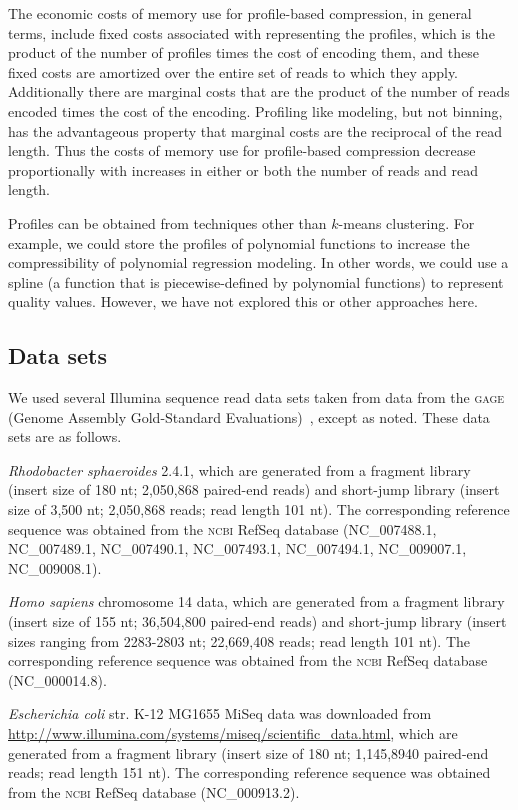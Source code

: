 \documentclass{bioinfo}
\begin{document}
\begin{methods}
The economic costs of memory use for profile-based compression, in
general terms, include fixed costs associated with representing the
profiles, which is the product of the number of profiles times the
cost of encoding them, and these fixed costs are amortized over the
entire set of reads to which they apply. Additionally there are
marginal costs that are the product of the number of reads encoded
times the cost of the encoding. Profiling like modeling, but not
binning, has the advantageous property that marginal costs are the
reciprocal of the read length. Thus the costs of memory use for
profile-based compression decrease proportionally with increases in
either or both the number of reads and read length.

Profiles can be obtained from techniques other than $k$-means
clustering. For example, we could store the profiles of polynomial
functions to increase the compressibility of polynomial regression
modeling. In other words, we could use a spline (a function that is
piecewise-defined by polynomial functions) to represent quality
values. However, we have not explored this or other approaches here.

\subsection{Data sets}

We used several Illumina sequence read data sets taken from data from
the \textsc{gage} (Genome Assembly Gold-Standard
Evaluations)~\citep{Salzberg:2012rc}, except as noted. These data sets
are as follows.

\textit{Rhodobacter sphaeroides} 2.4.1, which are generated from a
fragment library (insert size of 180 nt; 2,050,868 paired-end reads)
and short-jump library (insert size of 3,500 nt; 2,050,868 reads; read
length 101 nt). The corresponding reference sequence was obtained from
the \textsc{ncbi} RefSeq database (NC\_007488.1, NC\_007489.1,
NC\_007490.1, NC\_007493.1, NC\_007494.1, NC\_009007.1, NC\_009008.1).

\textit{Homo sapiens} chromosome 14 data, which are generated from a
fragment library (insert size of 155 nt; 36,504,800 paired-end reads)
and short-jump library (insert sizes ranging from 2283-2803 nt;
22,669,408 reads; read length 101 nt). The corresponding reference
sequence was obtained from the \textsc{ncbi} RefSeq database
(NC\_000014.8).

\textit{Escherichia coli} str. K-12 MG1655 MiSeq data was downloaded
from \url{http://www.illumina.com/systems/miseq/scientific_data.html},
which are generated from a fragment library (insert size of 180 nt;
1,145,8940 paired-end reads; read length 151 nt). The corresponding
reference sequence was obtained from the \textsc{ncbi} RefSeq database
(NC\_000913.2).


\end{methods}
\end{document}
